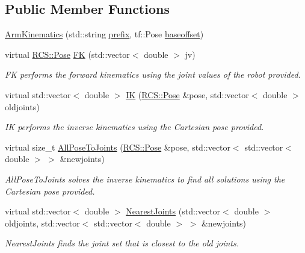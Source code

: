 \subsection*{Public Member Functions}
\begin{DoxyCompactItemize}
\item 
\hyperlink{classArmKinematics_a3716ba10905a5f540cfa5dc9030f6eb3}{Arm\-Kinematics} (std\-::string \hyperlink{classIKinematics_a62baaf78436911eca42896cad4b5c911}{prefix}, tf\-::\-Pose \hyperlink{classIKinematics_aa599f7938cbf1c9b422a6d4d50e8e1a9}{baseoffset})
\item 
virtual \hyperlink{namespaceRCS_aa07e45d8a50e30064283d2b38087f999}{R\-C\-S\-::\-Pose} \hyperlink{classArmKinematics_a1773ef10fcdd9bfb7b5d806c42bcbfb1}{F\-K} (std\-::vector$<$ double $>$ jv)
\begin{DoxyCompactList}\small\item\em F\-K performs the forward kinematics using the joint values of the robot provided. \end{DoxyCompactList}\item 
virtual std\-::vector$<$ double $>$ \hyperlink{classArmKinematics_a28e91de4fcb7ae0e8d4ce7d83bef2165}{I\-K} (\hyperlink{namespaceRCS_aa07e45d8a50e30064283d2b38087f999}{R\-C\-S\-::\-Pose} \&pose, std\-::vector$<$ double $>$ oldjoints)
\begin{DoxyCompactList}\small\item\em I\-K performs the inverse kinematics using the Cartesian pose provided. \end{DoxyCompactList}\item 
virtual size\-\_\-t \hyperlink{classArmKinematics_a18053e73102f70dfe7260eafe48b3548}{All\-Pose\-To\-Joints} (\hyperlink{namespaceRCS_aa07e45d8a50e30064283d2b38087f999}{R\-C\-S\-::\-Pose} \&pose, std\-::vector$<$ std\-::vector$<$ double $>$ $>$ \&newjoints)
\begin{DoxyCompactList}\small\item\em All\-Pose\-To\-Joints solves the inverse kinematics to find all solutions using the Cartesian pose provided. \end{DoxyCompactList}\item 
virtual std\-::vector$<$ double $>$ \hyperlink{classArmKinematics_a7836b4724f8036ca171c21b9877b7a7e}{Nearest\-Joints} (std\-::vector$<$ double $>$ oldjoints, std\-::vector$<$ std\-::vector$<$ double $>$ $>$ \&newjoints)
\begin{DoxyCompactList}\small\item\em Nearest\-Joints finds the joint set that is closest to the old joints. \end{DoxyCompactList}\item 

\end{DoxyCompactItemize}
